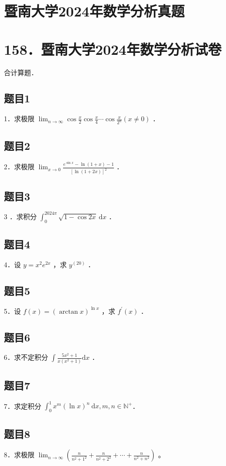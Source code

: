 \documentclass{article}
\begin{document}
\section*{暨南大学2024年数学分析真题}
\section*{158．暨南大学2024年数学分析试卷}
合计算题．

\subsection{题目1}
1．求极限 \(\lim _{n \rightarrow \infty} \cos \frac{x}{2} \cos \frac{x}{4} \cdots \cos \frac{x}{2^{n}}(x \neq 0)\) ．

\subsection{题目2}
2．求极限 \(\lim _{x \rightarrow 0} \frac{e^{\sin x}-\ln (1+x)-1}{[\ln (1+2 x)]^{2}}\) ．

\subsection{题目3}
3 ．求积分 \(\int_{0}^{2024 \pi} \sqrt{1-\cos 2 x} \mathrm{~d} x\) ．

\subsection{题目4}
4．设 \(y=x^{2} e^{2 x}\) ，求 \(y^{(20)}\) ．

\subsection{题目5}
5．设 \(f(x)=(\arctan x)^{\ln x}\) ，求 \(f^{\prime}(x)\) ．

\subsection{题目6}
6．求不定积分 \(\int \frac{5 x^{2}+1}{x\left(x^{2}+1\right)} \mathrm{d} x\) ．

\subsection{题目7}
7．求定积分 \(\int_{0}^{1} x^{m}(\ln x)^{n} \mathrm{~d} x, m, n \in \mathbb{N}^{+}\)．

\subsection{题目8}
8．求极限 \(\lim _{n \rightarrow \infty}\left(\frac{n}{n^{2}+1^{2}}+\frac{n}{n^{2}+2^{2}}+\cdots+\frac{n}{n^{2}+n^{2}}\right)\) 。
\end{document}
